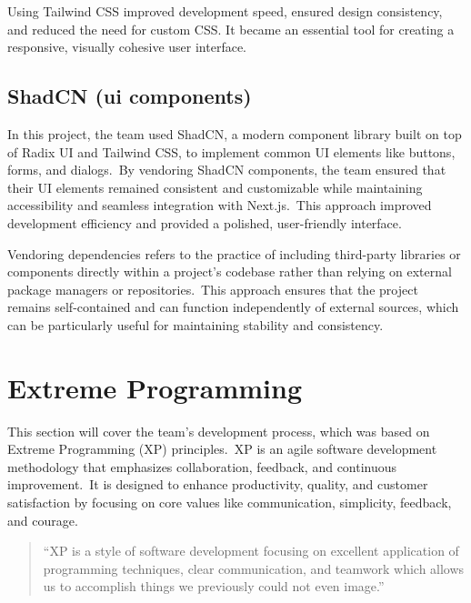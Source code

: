 Using Tailwind CSS improved development speed, ensured design consistency, and reduced the need for custom CSS. It became an essential tool for creating a responsive, visually cohesive user interface.



\subsection{ShadCN (ui components)}\label{subsec:shadcn-(ui-components)}
In this project, the team used ShadCN, a modern component library built on top of Radix UI and Tailwind CSS, to implement common UI elements like buttons, forms, and dialogs.\ By vendoring ShadCN components, the team ensured that their UI elements remained consistent and customizable while maintaining accessibility and seamless integration with Next.js.\ This approach improved development efficiency and provided a polished, user-friendly interface.

Vendoring dependencies refers to the practice of including third-party libraries or components directly within a project's codebase rather than relying on external package managers or repositories.\ This approach ensures that the project remains self-contained and can function independently of external sources, which can be particularly useful for maintaining stability and consistency.\cite[ShadCN]{shadcn}



\section[Extreme Programming]{Extreme Programming}\label{sec:extreme-programming}

This section will cover the team's development process, which was based on Extreme Programming (XP) principles.\ XP is an agile software development methodology that emphasizes collaboration, feedback, and continuous improvement.\ It is designed to enhance productivity, quality, and customer satisfaction by focusing on core values like communication, simplicity, feedback, and courage.

\begin{quote}
    ``XP is a style of software development focusing on excellent application of programming techniques, clear communication, and teamwork which allows us to accomplish things we previously could not even image.''\cite[Extreme Programming]{xp}
\end{quote}

